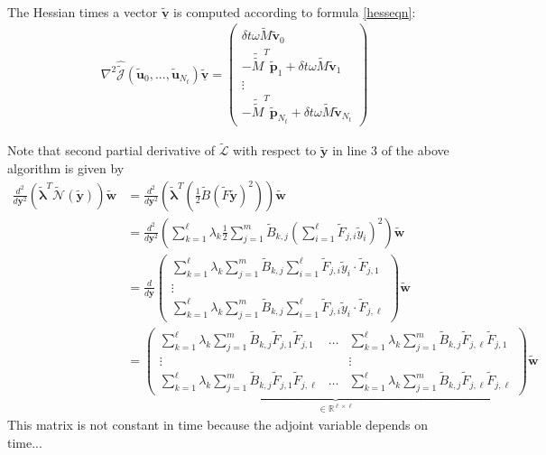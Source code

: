 \begin{algorithm}[H]
\begin{algorithmic}[1]
\begin{subequations}
\begin{align}
\end{align}
\end{subequations}
\STATE The Hessian times a vector $\mathbf{\underline{\tilde{v}}}$ is computed according to formula \eqref{hesseqn}:
\begin{align}
\label{HessRedOrder}
\nabla^2 \hat{\tilde{\mathcal{J}}}(\mathbf{\tilde{u}}_0,...,\mathbf{\tilde{u}}_{N_t}) \mathbf{\underline{\tilde{v}}} = \begin{pmatrix} \delta \! t \omega \tilde{M} \mathbf{\tilde{v}}_0 \\ -\tilde{\tilde{M}}^T \mathbf{\tilde{p}}_1 + \delta \! t \omega \tilde{M} \mathbf{\tilde{v}}_1\\ \vdots \\ -\tilde{\tilde{M}}^T \mathbf{\tilde{p}}_{N_t} + \delta \! t \omega \tilde{M} \mathbf{\tilde{v}}_{N_t} \end{pmatrix}
\end{align}
\end{algorithmic}
\end{algorithm}

Note that second partial derivative of $\tilde{\mathcal L}$ with respect to $\mathbf{\tilde{y}}$ in line 3 of the above algorithm is given by
\begin{align*}
\frac{d^2}{d\mathbf{y}^2} \left( \tilde{\boldsymbol \lambda}^T \tilde{\mathcal{N}}(\mathbf{\tilde{y}}) \right) \mathbf{\tilde{w}} &=  \frac{d^2}{d\mathbf{y}^2} \left( \boldsymbol{\tilde{\lambda}}^T (\frac{1}{2} \tilde{B} (\tilde{F} \mathbf{\tilde{y}})^2) \right) \mathbf{\tilde{w}} \\
&=\frac{d^2}{d\mathbf{y}^2} \left( \sum_{k=1}^\ell \lambda_k \frac{1}{2} \sum_{j=1}^m \tilde{B}_{k,j} \left( \sum_{i=1}^\ell \tilde{F}_{j,i}\tilde{y}_i \right)^2 \right) \mathbf{\tilde{w}} \\
&= \frac{d}{d\mathbf{y}} \begin{pmatrix} \sum_{k=1}^\ell \lambda_k \sum_{j=1}^m \tilde{B}_{k,j} \sum_{i=1}^\ell \tilde{F}_{j,i}\tilde{y}_i \cdot \tilde{F}_{j,1}\\ \vdots \\ \sum_{k=1}^\ell \lambda_k \sum_{j=1}^m \tilde{B}_{k,j} \sum_{i=1}^\ell \tilde{F}_{j,i}\tilde{y}_i \cdot \tilde{F}_{j,\ell} \end{pmatrix}\mathbf{\tilde{w}} \\
&= \underbrace{\begin{pmatrix} \sum_{k=1}^\ell \lambda_k \sum_{j=1}^m \tilde{B}_{k,j} \tilde{F}_{j,1} \tilde{F}_{j,1} & \hdots & \sum_{k=1}^\ell \lambda_k \sum_{j=1}^m \tilde{B}_{k,j} \tilde{F}_{j,\ell} \tilde{F}_{j,1}\\ \vdots & & \vdots \\ \sum_{k=1}^\ell \lambda_k \sum_{j=1}^m \tilde{B}_{k,j} \tilde{F}_{j,1} \tilde{F}_{j,\ell} & \hdots & \sum_{k=1}^\ell \lambda_k \sum_{j=1}^m \tilde{B}_{k,j} \tilde{F}_{j,\ell} \tilde{F}_{j,\ell} \end{pmatrix}}_{\in \mathbb{R}^{\ell \times \ell}} \mathbf{\tilde{w}}
\end{align*}
This matrix is not constant in time because the adjoint variable depends on time...

